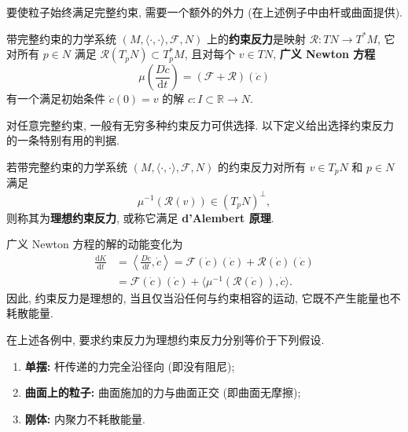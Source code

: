要使粒子始终满足完整约束, 需要一个额外的外力 (在上述例子中由杆或曲面提供).

\begin{RiemannDefinition}\label{def:reaction-force-for-holonomic-constraint}
带完整约束的力学系统 $(M,\langle\cdot,\cdot\rangle,\mathcal{F},N)$ 上的\textbf{约束反力}是映射 $\mathcal{R}:TN\to T^*M$, 它对所有 $p\in N$ 满足 $\mathcal{R}(T_pN)\subset T_p^*M$, 且对每个 $v\in TN$, \textbf{广义 Newton 方程}
\[
  \mu\left(\frac{D\dot c}{\mathrm{d}t}\right)
  =(\mathcal{F}+\mathcal{R})(\dot c)
\]
有一个满足初始条件 $\dot c(0)=v$ 的解 $c:I\subset\mathbb{R}\to N$.
\end{RiemannDefinition}

对任意完整约束, 一般有无穷多种约束反力可供选择. 以下定义给出选择约束反力的一条特别有用的判据.

\begin{RiemannDefinition}\label{def:perfect-reaction-force}
若带完整约束的力学系统 $(M,\langle\cdot,\cdot\rangle,\mathcal{F},N)$ 的约束反力对所有 $v\in T_pN$ 和 $p\in N$ 满足
\[
  \mu^{-1}(\mathcal{R}(v))\in(T_pN)^\perp,
\]
则称其为\textbf{理想约束反力}, 或称它满足 \textbf{d’Alembert 原理}.
\end{RiemannDefinition}

\begin{RiemannRemark}\label{rem:perfect-reaction-does-no-work}
广义 Newton 方程的解的动能变化为
\begin{align*}
  \frac{\mathrm{d}K}{\mathrm{d}t}
  &=\left\langle\frac{D\dot c}{\mathrm{d}t},\dot c\right\rangle
  =\mathcal{F}(\dot c)(\dot c)+\mathcal{R}(\dot c)(\dot c)\\
  &=\mathcal{F}(\dot c)(\dot c)+\bigl\langle\mu^{-1}(\mathcal{R}(\dot c)),\dot c\bigr\rangle.
\end{align*}
因此, 约束反力是理想的, 当且仅当沿任何与约束相容的运动, 它既不产生能量也不耗散能量.
\end{RiemannRemark}

\begin{RiemannExample}\label{ex:perfect-reactions-in-three-holonomic-systems}
在上述各例中, 要求约束反力为理想约束反力分别等价于下列假设.
\begin{enumerate}[label=(\arabic*),leftmargin=*]
\item \textbf{单摆:} 杆传递的力完全沿径向 (即没有阻尼);
\item \textbf{曲面上的粒子:} 曲面施加的力与曲面正交 (即曲面无摩擦);
\item \textbf{刚体:} 内聚力不耗散能量.
\end{enumerate}
\end{RiemannExample}

